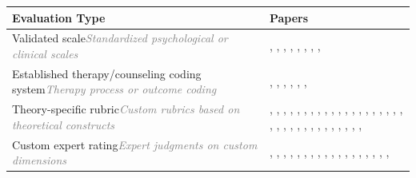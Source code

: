 \begin{table}[tbp]
\centering
\small
\begin{tabular}{p{6cm}p{8cm}}
\toprule
\textbf{Evaluation Type} & \textbf{Papers} \\
\midrule
Validated scale\newline\textcolor{gray}{\footnotesize{\textit{Standardized psychological or clinical scales}}} & \citealp{Xiao2024HealMe}, \citealp{Qiu2025EmoAgent}, \citealp{Li2024Understanding}, \citealp{Wang2024Towards}, \citealp{Schmidmaier2025Using}, \citealp{Schmidmaier2025UsingNonverbal}, \citealp{Yang2025CAMI}, \citealp{Chen2025MIND}, \citealp{Wang2025Psychological} \\
\midrule
Established therapy/counseling coding system\newline\textcolor{gray}{\footnotesize{\textit{Therapy process or outcome coding}}} & \citealp{Xiao2024HealMe}, \citealp{Zhang2025CBT-BENCH}, \citealp{Lee2024CACTUS}, \citealp{Feng2025Reframe}, \citealp{Kim2025MIRROR}, \citealp{Kim2025Can}, \citealp{Tanana2019Development} \\
\midrule
Theory-specific rubric\newline\textcolor{gray}{\footnotesize{\textit{Custom rubrics based on theoretical constructs}}} & \citealp{Xiao2024HealMe}, \citealp{Gabriel2024Can}, \citealp{Qiu2025EmoAgent}, \citealp{Aghakhani2025From}, \citealp{Wang2025CARE-Bench}, \citealp{Sungarda2025GenAI}, \citealp{Liu2023ChatCounselor}, \citealp{Chiu2024A}, \citealp{Li2024Understanding}, \citealp{Wang2024Towards}, \citealp{Fouda2026PsychiatryBench}, \citealp{Cai2026Exploring}, \citealp{Qiu2026PsyCLIENT}, \citealp{Nguyen2025Do}, \citealp{Zhang2025CBT-BENCH}, \citealp{Kim2025KMI}, \citealp{Xu2025MentalChat16K}, \citealp{Ozgun2025Trustworthy}, \citealp{Louie2026Can}, \citealp{Louie2024Roleplay-doh}, \citealp{Wang2024PATIENT}, \citealp{Lee2024CACTUS}, \citealp{Basar2024To}, \citealp{Yang2025Consistent}, \citealp{Yang2025CAMI}, \citealp{Basar2025How}, \citealp{Feng2025Reframe}, \citealp{Kim2025MIRROR}, \citealp{Kim2025Can}, \citealp{Samuel2025PersonaGym}, \citealp{Chen2025MIND}, \citealp{Na2024CBT-LLM}, \citealp{Sharma2023Cognitive}, \citealp{Kang2024Can}, \citealp{Wang2025Psychological} \\
\midrule
Custom expert rating\newline\textcolor{gray}{\footnotesize{\textit{Expert judgments on custom dimensions}}} & \citealp{Xiao2024HealMe}, \citealp{Gabriel2024Can}, \citealp{Haydarov2025Towards}, \citealp{Wang2025CARE-Bench}, \citealp{Qiu2026PsyCLIENT}, \citealp{Kim2025KMI}, \citealp{Louie2026Can}, \citealp{Louie2024Roleplay-doh}, \citealp{Wang2024PATIENT}, \citealp{Basar2024To}, \citealp{Yang2025Consistent}, \citealp{Basar2025How}, \citealp{Kim2025MIRROR}, \citealp{Liu2025Eeyore}, \citealp{Na2024CBT-LLM}, \citealp{Sharma2023Cognitive}, \citealp{Kang2024Can}, \citealp{Schmidgall2025AgentClinic}, \citealp{Wang2025Psychological} \\

\end{tabular}
\end{table}
